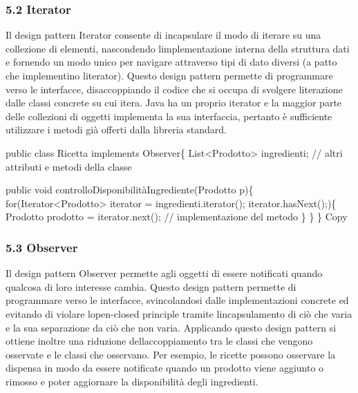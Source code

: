 \documentclass[
]{article}
\newenvironment{Shaded}{}{}
\newcommand{\NormalTok}[1]{#1}
\begin{document}
\subsubsection{5.2 Iterator}\label{iterator}

Il design pattern Iterator consente di incapsulare il modo di iterare su
una collezione di elementi, nascondendo
l\textquotesingle implementazione interna della struttura dati e
fornendo un modo unico per navigare attraverso tipi di dato diversi (a
patto che implementino l\textquotesingle iterator). Questo design
pattern permette di programmare verso le interfacce, disaccoppiando il
codice che si occupa di svolgere l\textquotesingle iterazione dalle
classi concrete su cui itera. Java ha un proprio iterator e la maggior
parte delle collezioni di oggetti implementa la sua interfaccia,
pertanto è sufficiente utilizzare i metodi già offerti dalla libreria
standard.

\begin{Shaded}
\begin{Highlighting}[]
\NormalTok{public class Ricetta implements Observer\{}
\NormalTok{    List\textless{}Prodotto\textgreater{} ingredienti;}
\NormalTok{    // altri attributi e metodi della classe}
    
\NormalTok{    public void controlloDisponibilitàIngrediente(Prodotto p)\{}
\NormalTok{        for(Iterator\textless{}Prodotto\textgreater{} iterator = ingredienti.iterator(); iterator.hasNext();)\{  }
\NormalTok{            Prodotto prodotto = iterator.next();}
\NormalTok{            // implementazione del metodo  }
\NormalTok{        \}}
\NormalTok{    \}}
\NormalTok{\}}
\NormalTok{Copy}
\end{Highlighting}
\end{Shaded}

\subsubsection{5.3 Observer}\label{observer}

Il design pattern Observer permette agli oggetti di essere notificati
quando qualcosa di loro interesse cambia. Questo design pattern permette
di programmare verso le interfacce, svincolandosi dalle implementazioni
concrete ed evitando di violare l\textquotesingle open-closed principle
tramite l\textquotesingle incapsulamento di ciò che varia e la sua
separazione da ciò che non varia. Applicando questo design pattern si
ottiene inoltre una riduzione dell\textquotesingle accoppiamento tra le
classi che vengono osservate e le classi che osservano. Per esempio, le
ricette possono osservare la dispensa in modo da essere notificate
quando un prodotto viene aggiunto o rimosso e poter aggiornare la
disponibilità degli ingredienti.
\end{document}
